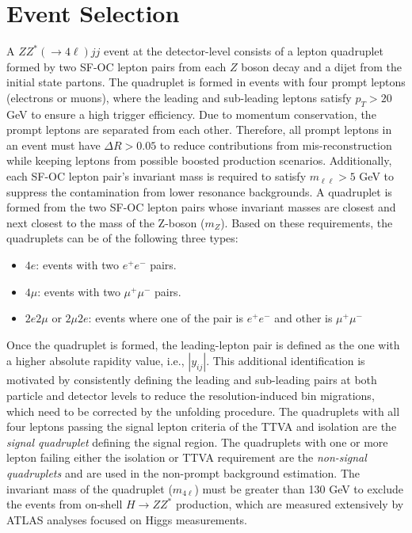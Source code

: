 \section{Event Selection}
\label{sec:EventSel}

A $ZZ^*(\rightarrow 4\ell) jj$ event at the detector-level consists of a lepton quadruplet formed by two SF-OC lepton pairs from each $Z$ boson decay and a dijet from the initial state partons. The quadruplet is formed in events with four prompt leptons (electrons or muons), where the leading and sub-leading leptons satisfy $p_{T} > 20$ GeV to ensure a high trigger efficiency. Due to momentum conservation, the prompt leptons are separated from each other. Therefore, all prompt leptons in an event must have $\Delta R > 0.05$ to reduce contributions from mis-reconstruction while keeping leptons from possible boosted production scenarios. Additionally, each SF-OC lepton pair's invariant mass is required to satisfy $m_{\ell \ell } > 5$ GeV to suppress the contamination from lower resonance backgrounds. A quadruplet is formed from the two SF-OC lepton pairs whose invariant masses are closest and next closest to the mass of the Z-boson ($m_{Z}$). Based on these requirements, the quadruplets can be of the following three types:

\begin{itemize}
\item{$4e$: events with two $e^{+}e^{-}$ pairs.}
\item{$4\mu$: events with two $\mu^{+}\mu^{-}$ pairs.}
\item{$2e2\mu$ or $2\mu2e$: events where one of the pair is $e^{+}e^{-}$ and other is $\mu^{+}\mu^{-}$}
\end{itemize}

Once the quadruplet is formed, the leading-lepton pair is defined as the one with a higher absolute rapidity value, i.e., $|y_{ij}|$. This additional identification is motivated by consistently defining the leading and sub-leading pairs at both particle and detector levels to reduce the resolution-induced bin migrations, which need to be corrected by the unfolding procedure. The quadruplets with all four leptons passing the signal lepton criteria of the TTVA and isolation are the \textit{signal quadruplet} defining the signal region. The quadruplets with one or more lepton failing either the isolation or TTVA requirement are the \textit{non-signal quadruplets} and are used in the non-prompt background estimation. The invariant mass of the quadruplet ($m_{4\ell}$) must be greater than 130 GeV to exclude the events from on-shell $H\rightarrow ZZ^*$ production, which are measured extensively by ATLAS analyses focused on Higgs measurements.

